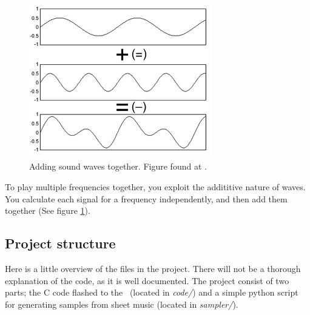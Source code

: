 \begin{figure}[h]
	\centering
	\includegraphics[width=8cm]{img/sumofsines.jpg}
	\caption{Adding sound waves together. Figure found at \cite{fourier}.}
	\label{fig:adding_waves}
\end{figure}
To play multiple frequencies together, you exploit the addititive nature of waves. You calculate each signal for a frequency independently, and then add them together (See figure \ref{fig:adding_waves}).
\subsection{Project structure}
Here is a little overview of the files in the project. There will not be a thorough explanation of the code, as it is well documented. The project consist of two parts; the C code flashed to the \boardName\ (located in \emph{code/}) and a simple python script for generating samples from sheet music (located in \emph{sampler/}).

